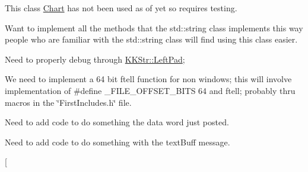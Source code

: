 
\begin{DoxyRefList}
\item[\label{todo__todo000015}%
\hypertarget{todo__todo000015}{}%
Class \hyperlink{class_k_k_b_1_1_chart}{K\+KB\+:\+:Chart} ]This class \hyperlink{class_k_k_b_1_1_chart}{Chart} has not been used as of yet so requires testing.  
\item[\label{todo__todo000013}%
\hypertarget{todo__todo000013}{}%
Member \hyperlink{class_k_k_b_1_1_k_k_str_a3972260712f99de712591dc5be2d3eef}{K\+KB\+:\+:K\+K\+Str\+:\+:Find} (const \hyperlink{class_k_k_b_1_1_k_k_str}{K\+K\+Str} \&str, kkint32 pos=0) const ]Want to implement all the methods that the std\+::string class implements this way people who are familiar with the std\+::string class will find using this class easier.  
\item[\label{todo__todo000016}%
\hypertarget{todo__todo000016}{}%
Member \hyperlink{class_k_k_b_1_1_k_k_str_a5fc76668dbfe28861b45ecebda941b7c}{K\+KB\+:\+:K\+K\+Str\+:\+:Left\+Pad} (kkint32 width, uchar ch= \textquotesingle{} \textquotesingle{})]Need to properly debug through \textquotesingle{}\hyperlink{class_k_k_b_1_1_k_k_str_a5fc76668dbfe28861b45ecebda941b7c}{K\+K\+Str\+::\+Left\+Pad};  
\item[\label{todo__todo000005}%
\hypertarget{todo__todo000005}{}%
Member \hyperlink{class_k_k_l_s_c_1_1_scanner_file3_bit_encoded_ab6ef1007e883fd2d3f2a6cb6a91451fd}{K\+K\+L\+SC\+:\+:Scanner\+File3\+Bit\+Encoded\+:\+:Write\+Buffer\+Frame} ()]We need to implement a 64 bit ftell function for non windows; this will involve implementation of \textquotesingle{}\#define \+\_\+\+F\+I\+L\+E\+\_\+\+O\+F\+F\+S\+E\+T\+\_\+\+B\+I\+TS 64\textquotesingle{} and ftell; probably thru macros in the \char`\"{}\+First\+Includes.\+h\char`\"{} file.  
\item[\label{todo__todo000002}%
\hypertarget{todo__todo000002}{}%
Member \hyperlink{class_k_k_l_s_c_1_1_scanner_file_af156749ba59d3e87182ef64a33251f89}{K\+K\+L\+SC\+:\+:Scanner\+File\+:\+:Report\+Instrument\+Data\+Word} (uchar id\+Num, kkuint32 scan\+Line\+Num, Word\+Format32\+Bits data\+Word)]Need to add code to do something the data word just posted.  
\item[\label{todo__todo000001}%
\hypertarget{todo__todo000001}{}%
Member \hyperlink{class_k_k_l_s_c_1_1_scanner_file_a642d150fc6003b4a3e5734c8d7fe38de}{K\+K\+L\+SC\+:\+:Scanner\+File\+:\+:Report\+Text\+Msg} (const char $\ast$text\+Buff, kkint32 num\+Text\+Bytes)]Need to add code to do something with the text\+Buff message.  
\item[\label{todo__todo000009}%

\end{DoxyRefList}
